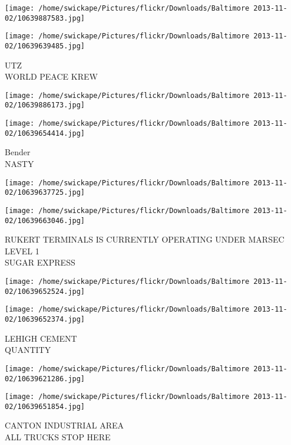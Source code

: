 \documentclass[10pt,letterpaper]{article}
\begin{document}
\texttt{[image: /home/swickape/Pictures/flickr/Downloads/Baltimore 2013-11-02/10639887583.jpg]}

\vspace{0.25in}
\texttt{[image: /home/swickape/Pictures/flickr/Downloads/Baltimore 2013-11-02/10639639485.jpg]}

UTZ\\
WORLD PEACE KREW\\
\pagebreak

\texttt{[image: /home/swickape/Pictures/flickr/Downloads/Baltimore 2013-11-02/10639886173.jpg]}

\vspace{0.25in}
\texttt{[image: /home/swickape/Pictures/flickr/Downloads/Baltimore 2013-11-02/10639654414.jpg]}

Bender\\
NASTY\\
\pagebreak

\texttt{[image: /home/swickape/Pictures/flickr/Downloads/Baltimore 2013-11-02/10639637725.jpg]}

\vspace{0.25in}
\texttt{[image: /home/swickape/Pictures/flickr/Downloads/Baltimore 2013-11-02/10639663046.jpg]}

RUKERT TERMINALS IS CURRENTLY OPERATING UNDER MARSEC LEVEL 1\\
SUGAR EXPRESS\\
\pagebreak

\texttt{[image: /home/swickape/Pictures/flickr/Downloads/Baltimore 2013-11-02/10639652524.jpg]}

\vspace{0.25in}
\texttt{[image: /home/swickape/Pictures/flickr/Downloads/Baltimore 2013-11-02/10639652374.jpg]}

LEHIGH CEMENT\\
QUANTITY\\
\pagebreak

\texttt{[image: /home/swickape/Pictures/flickr/Downloads/Baltimore 2013-11-02/10639621286.jpg]}

\vspace{0.25in}
\texttt{[image: /home/swickape/Pictures/flickr/Downloads/Baltimore 2013-11-02/10639651854.jpg]}

CANTON INDUSTRIAL AREA\\
ALL TRUCKS STOP HERE\\
\pagebreak
\end{document}
